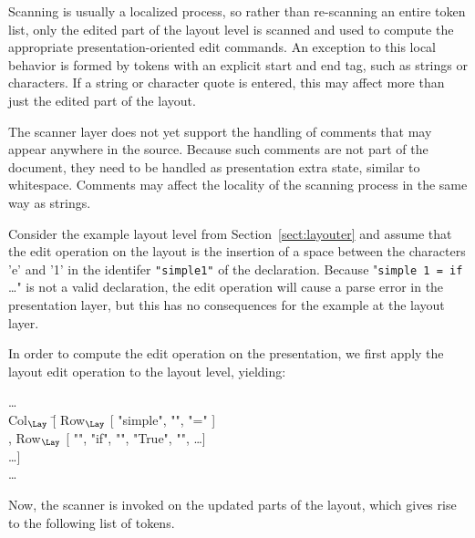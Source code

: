 Scanning is usually a localized process, so rather than re-scanning an entire token list, only the edited part of the layout level is scanned and used to compute the appropriate presentation-oriented edit commands. An exception to this local behavior is formed by tokens with an explicit start and end tag, such as strings or characters. If a string or character quote is entered, this may affect more than just the edited part of the layout.

The scanner layer does not yet support the handling of comments that may appear anywhere in the source. Because such comments are not part of the document, they need to be handled as presentation extra state, similar to whitespace. Comments may affect the locality of the scanning process in the same way as strings.


Consider the example layout level from Section~\ref{sect:layouter} and assume that the edit operation on the layout is the insertion of a space between the characters 'e' and '1' in the identifer \verb|"simple1"| of the declaration. Because "\verb|simple 1 = if |\dots" is not a valid declaration, the edit operation will cause a parse error in the presentation layer, but this has no consequences for the example at the layout layer.

In order to compute the edit operation on the presentation, we first apply the layout edit operation to the layout level, yielding:

\small \ttfamily
\begin{tabbing}
\dots\\
Col$_{\Lay}$ \= [ Row$_{\Lay}$ [ "simple", "\textvisiblespace", "=" ]\\
                   \> , Row$_{\Lay}$ [ "\textvisiblespace\textvisiblespace", 
                                                 "if", "\textvisiblespace", "True", "\textvisiblespace", \dots ] \\
                   \> \dots ]\\
\dots
\end{tabbing}
\rmfamily \normalsize

Now, the scanner is invoked on the updated parts of the layout, which gives rise to the following list of tokens.

